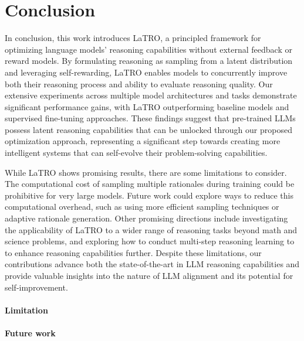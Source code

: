 
\section{Conclusion}
\label{sec:conclusion}


In conclusion, this work introduces LaTRO, a principled framework for optimizing language models' reasoning capabilities without external feedback or reward models. By formulating reasoning as sampling from a latent distribution and leveraging self-rewarding, LaTRO enables models to concurrently improve both their reasoning process and ability to evaluate reasoning quality. Our extensive experiments across multiple model architectures and tasks demonstrate significant performance gains, with LaTRO outperforming baseline models and supervised fine-tuning approaches. These findings suggest that pre-trained LLMs possess latent reasoning capabilities that can be unlocked through our proposed optimization approach, representing a significant step towards creating more intelligent systems that can self-evolve their problem-solving capabilities.

While LaTRO shows promising results, there are some limitations to consider. The computational cost of sampling multiple rationales during training could be prohibitive for very large models. Future work could explore ways to reduce this computational overhead, such as using more efficient sampling techniques or adaptive rationale generation. Other promising directions include investigating the applicability of LaTRO to a wider range of reasoning tasks beyond math and science problems, and exploring how to 
conduct multi-step reasoning learning to to enhance reasoning capabilities further. Despite these limitations, our contributions advance both the state-of-the-art in LLM reasoning capabilities and provide valuable insights into the nature of LLM alignment and its potential for self-improvement.

\iffalse
\paragraph{Limitation}
\label{sec:limitaion}

\paragraph{Future work}
\label{sec:future_work}

